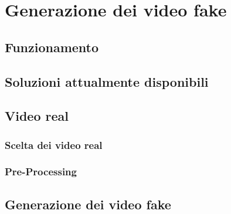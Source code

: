 \chapter{Generazione dei video fake}

\section{Funzionamento}

\section{Soluzioni attualmente disponibili}

\section{Video real}
\subsection{Scelta dei video real}
\subsection{Pre-Processing}
\section{Generazione dei video fake}

\clearpage
